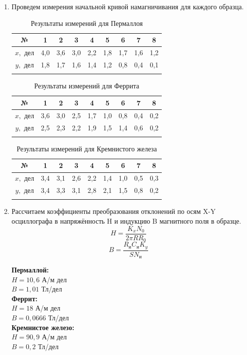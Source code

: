 \documentclass[a4paper, 12pt]{article}%
\begin{document}
\begin{enumerate}
	\item Проведем измерения начальной кривой намагничивания для каждого образца.
	
	\begin{longtable} {|c|c|c|c|c|c|c|c|c|}
		\hline
		№ & 1 & 2 & 3 & 4 & 5 & 6 & 7 & 8 \\ \hline 
		$x, $ дел & 4,0 & 3,6 & 3,0 & 2,2 & 1,8 & 1,7 & 1,6 & 1,2 \\ \hline
		$y, $ дел & 1,8 & 1,7 & 1,6 & 1,4 & 1,2 & 0,8 & 0,4 & 0,1 \\ \hline
		
		\caption{Результаты измерений для Пермаллоя}
	\end{longtable}
		
	\begin{longtable} {|c|c|c|c|c|c|c|c|c|}
		\hline
		№ & 1 & 2 & 3 & 4 & 5 & 6 & 7 & 8 \\ \hline 
		$x, $ дел & 3,6 & 3,0 & 2,5 & 1,7 & 1,0 & 0,8 & 0,4 & 0,2 \\ \hline
		$y, $ дел & 2,5 & 2,3 & 2,2 & 1,9 & 1,5 & 1,4 & 0,6 & 0,2 \\ \hline
		
		\caption{Результаты измерений для Феррита}
	\end{longtable}
		
	\begin{longtable} {|c|c|c|c|c|c|c|c|c|}
		\hline
		№ & 1 & 2 & 3 & 4 & 5 & 6 & 7 & 8 \\ \hline 
		$x, $ дел  & 3,4 & 3,1 & 2,6 & 2,2 & 1,4 & 1,0 & 0,5& 0,3 \\ \hline
		$y, $ дел  & 3,4 & 3,3 & 3,1 & 2,8 & 2,1 & 1,5 & 0,8 & 0,2 \\ \hline
		
		\caption{Результаты измерений для Кремнистого железа}
	\end{longtable}	
		
	\item Рассчитаем коэффициенты преобразования отклонений по осям
	X-Y осциллографа в напряжённость H и индукцию B магнитного
	поля в образце.
		$$H=\dfrac{K_xN_{0}}{2\pi RR_0}$$
		$$B=\dfrac{R_{\text{и}}C_{\text{и}}K_y}{SN_{\text{и}}}$$
		
	\textbf{Пермаллой: }\\
	$H = 10,6$ А/м дел \\
	$B = 1,01$ Тл/дел\\
	\textbf{Феррит: }\\
	$H = 18$ А/м дел \\
	$B = 0,0666$ Тл/дел\\
	\textbf{Кремнистое железо: }\\
	$H = 90,9$ А/м дел\\
	$B = 0,2$ Тл/дел\\
	

\end{enumerate}
\end{document}

